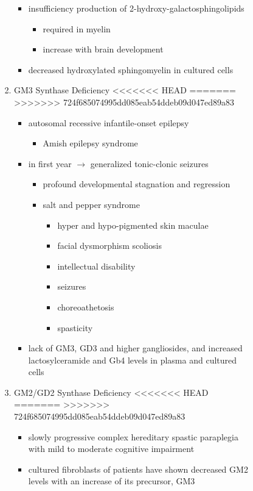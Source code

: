 \documentclass[fontsize=12pt]{scrartcl}
\begin{document}
\begin{enumerate}
\begin{enumerate}
\begin{enumerate}
\begin{enumerate}
\begin{enumerate}
\begin{itemize}
\item insufficiency production of 2-hydroxy-galactosphingolipids
\begin{itemize}
\item required in myelin
\item increase with brain development
\end{itemize}
\item decreased hydroxylated sphingomyelin in cultured cells
\end{itemize}

\item GM3 Synthase Deficiency
<<<<<<< HEAD
\label{sec:org6db210f}
=======
\label{sec:orgb43ded9}
>>>>>>> 724f685074995dd085eab54ddeb09d047ed89a83
\begin{itemize}
\item autosomal recessive infantile-onset epilepsy
\begin{itemize}
\item Amish epilepsy syndrome
\end{itemize}
\item in first year \(\to\) generalized tonic-clonic seizures
\begin{itemize}
\item profound developmental stagnation and regression
\item salt and pepper syndrome
\begin{itemize}
\item hyper and hypo-pigmented skin maculae
\item facial dysmorphism scoliosis
\item intellectual disability
\item seizures
\item choreoathetosis
\item spasticity
\end{itemize}
\end{itemize}
\item lack of GM3, GD3 and higher gangliosides, and increased
lactosylceramide and Gb4 levels in plasma and cultured cells
\end{itemize}

\item GM2/GD2 Synthase Deficiency
<<<<<<< HEAD
\label{sec:orga774477}
=======
\label{sec:org1b8a21e}
>>>>>>> 724f685074995dd085eab54ddeb09d047ed89a83
\begin{itemize}
\item slowly progressive complex hereditary spastic paraplegia
with mild to moderate cognitive impairment
\item cultured fibroblasts of patients have shown decreased GM2 levels
with an increase of its precursor, GM3
\end{itemize}


\end{enumerate}
\end{enumerate}
\end{enumerate}
\end{enumerate}
\end{enumerate}
\end{document}

